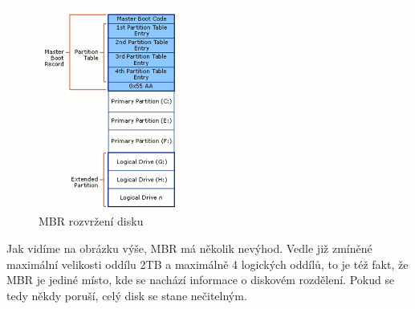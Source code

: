\documentclass[thesis=B,czech]{FITthesis}[2012/06/26]
\begin{document}
\begin{figure}[h]\centering
\includegraphics[width=0.5\textwidth]{files/mbr-disk-layout.png}
	\caption{MBR rozvržení disku}\label{fig:float}
\end{figure}



Jak vidíme na obrázku výše, MBR má několik nevýhod. Vedle již zmíněné maximální velikosti oddílu 2TB a maximálně 4 logických oddílů, to je též fakt, že MBR je jediné místo, kde se nachází informace o diskovém rozdělení. Pokud se tedy někdy poruší, celý disk se stane nečitelným.
\end{document}
